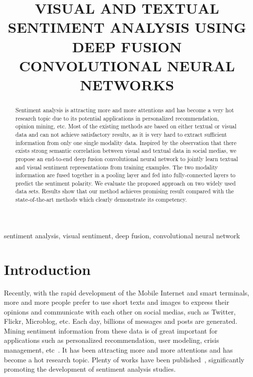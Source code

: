 \documentclass{article}
\title{VISUAL AND TEXTUAL SENTIMENT ANALYSIS USING DEEP FUSION CONVOLUTIONAL NEURAL NETWORKS}
\begin{document}
%
\maketitle
%
\begin{abstract}
Sentiment analysis is attracting more and more attentions and has become a very hot research topic due to its potential applications in personalized recommendation, opinion mining, etc. Most of the existing methods are based on either textual or visual data and can not achieve satisfactory results, as it is very hard to extract sufficient information from only one single modality data. Inspired by the observation that there exists strong semantic correlation between visual and textual data in social medias, we propose an end-to-end deep fusion convolutional neural network to jointly learn textual and visual sentiment representations from training examples. The two modality information are fused together in a pooling layer and fed into fully-connected layers to predict the sentiment polarity. We evaluate the proposed approach on two widely used data sets. Results show that our method achieves promising result compared with the state-of-the-art methods which clearly demonstrate its competency.
\end{abstract}
%
\begin{keywords}
sentiment analysis, visual sentiment, deep fusion, convolutional neural network
\end{keywords}
%


\section{Introduction}
\label{sec:intro}
\vspace{-0.1cm}
Recently, with the rapid development of the Mobile Internet and smart terminals, more and more people prefer to use short texts and images to express their opinions and communicate with each other on social medias, such as Twitter, Flickr, Microblog, etc. Each day, billions of messages and posts are generated. Mining sentiment information from these data is of great important for applications such as personalized recommendation, user modeling, crisis management, etc~\cite{Wu2016}. It has been attracting more and more attentions and has become a hot research topic. Plenty of works have been published~\cite{Wu2016, pang2008opinion, machajdik2010affective, you2015robust, wang2016beyond, ren2016context}, significantly promoting the development of sentiment analysis studies.
\end{document}
